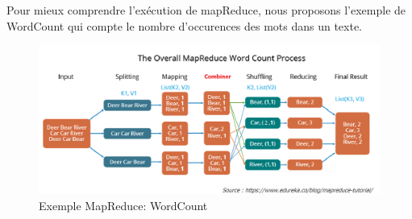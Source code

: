 Pour mieux comprendre l'exécution de mapReduce, nous proposons l'exemple de WordCount qui compte le nombre d'occurences des mots dans un texte.

\begin{figure}[H]
  \centering
    \includegraphics[scale=0.45]{images/mapreduce_process.png}
        \caption{Exemple MapReduce: WordCount}
\end{figure}


